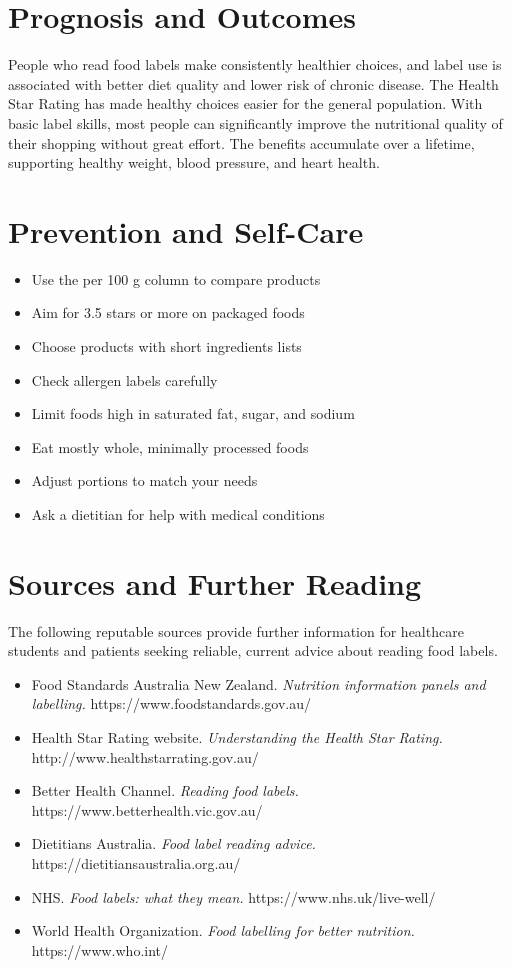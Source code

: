 \section*{Prognosis and Outcomes}
People who read food labels make consistently healthier choices, and label use is associated with better diet quality and lower risk of chronic disease. The Health Star Rating has made healthy choices easier for the general population. With basic label skills, most people can significantly improve the nutritional quality of their shopping without great effort. The benefits accumulate over a lifetime, supporting healthy weight, blood pressure, and heart health.

\section*{Prevention and Self-Care}
\begin{itemize}
    \item Use the per 100 g column to compare products
    \item Aim for 3.5 stars or more on packaged foods
    \item Choose products with short ingredients lists
    \item Check allergen labels carefully
    \item Limit foods high in saturated fat, sugar, and sodium
    \item Eat mostly whole, minimally processed foods
    \item Adjust portions to match your needs
    \item Ask a dietitian for help with medical conditions
\end{itemize}

\section*{Sources and Further Reading}
The following reputable sources provide further information for healthcare students and patients seeking reliable, current advice about reading food labels.

\begin{itemize}
    \item Food Standards Australia New Zealand. \textit{Nutrition information panels and labelling.} https://www.foodstandards.gov.au/
    \item Health Star Rating website. \textit{Understanding the Health Star Rating.} http://www.healthstarrating.gov.au/
    \item Better Health Channel. \textit{Reading food labels.} https://www.betterhealth.vic.gov.au/
    \item Dietitians Australia. \textit{Food label reading advice.} https://dietitiansaustralia.org.au/
    \item NHS. \textit{Food labels: what they mean.} https://www.nhs.uk/live-well/
    \item World Health Organization. \textit{Food labelling for better nutrition.} https://www.who.int/
\end{itemize}
